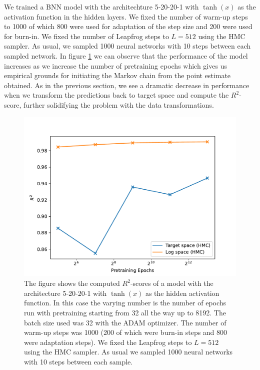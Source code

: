 We trained a BNN model with the architechture 5-20-20-1 with $\tanh(x)$ as the activation function in the hidden layers. We fixed the number of warm-up steps to 1000 of which 800 were used for adaptation of the step size and 200 were used for burn-in. We fixed the number of Leapfrog steps to $L = 512$ using the HMC sampler. As usual, we sampled 1000 neural networks with 10 steps between each sampled network. In figure \ref{fig:r2_score_vs_pretraining} we can observe that the performance of the model increases as we increase the number of pretraining epochs which gives us empirical grounds for initiating the Markov chain from the point estimate obtained. As in the previous section, we see a dramatic decrease in performance when we transform the predictions back to target space and compute the $R^2$-score, further solidifying the problem with the data transformations.
\begin{figure}[H]
    \centering
    \includegraphics[scale=0.7]{figures/r2_scores/r2_score_vs_pretraining.pdf}
    \caption{The figure shows the computed $R^2$-scores of a model with the architecture 5-20-20-1 with $\tanh(x)$ as the
    hidden activation function. In this case the varying number is the number of epochs run with pretraining starting from 32 all the way up to 8192. The batch size used was 32 with the ADAM optimizer. The number of warm-up steps was 1000 (200 of which were burn-in steps and 800 were adaptation steps). We fixed the Leapfrog steps to $L = 512$ using the HMC sampler. As usual we sampled 1000 neural networks with 10 steps between each sample.
    }
    \label{fig:r2_score_vs_pretraining}
\end{figure}

